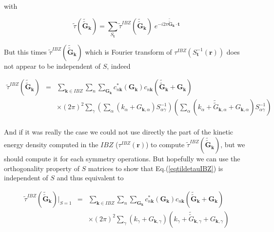 \documentclass[a4paper,12pt]{report}
\begin{document}
with

\begin{equation}
\tilde{\tau}(\tilde{\tilde{\mathbf{G}}}_{\mathbf{k}}) = \sum_{S_{\mathbf{t}}} \tilde{\tau}^{IBZ}(\tilde{\tilde{\mathbf{G}}}_{\mathbf{k}})\; e^{-i2\pi \tilde{\tilde{\mathbf{G}}}_{\mathbf{k}} \cdot \mathbf{t}}
\end{equation}

But this times $\tilde{\tau}^{IBZ}(\tilde{\tilde{\mathbf{G}}}_{\mathbf{k}})$ which is Fourier transform of $\tau^{IBZ}\left(S_{\mathbf{t}}^{-1}(\mathbf{r})\right)$ does not appear to be independent of $S$, indeed

\begin{eqnarray}
\tilde{\tau}^{IBZ}(\tilde{\tilde{\mathbf{G}}}_{\mathbf{k}}) &=& \sum_{\mathbf{k} \in IBZ} \sum_n \sum_{\mathbf{G}_{\mathbf{k}}} c_{n\mathbf{k}}^{*}(\mathbf{G}_{\mathbf{k}}) c_{n\mathbf{k}}(\tilde{\tilde{\mathbf{G}}}_{\mathbf{k}}+\mathbf{G}_{\mathbf{k}})  \nonumber \\
&&\times  (2\pi)^2 \sum_{\gamma} \left(\sum_{\alpha}\left( k_{\alpha} + G_{\mathbf{k},\alpha}\right) S_{\alpha\gamma}^{-1} \right) \left(\sum_{\alpha}\left( k_{\alpha} + \tilde{\tilde{G}}_{\mathbf{k},\alpha} + G_{\mathbf{k},\alpha}\right) S_{\alpha\gamma}^{-1} \right) \nonumber \\
\label{eqtildetauIBZ}
\end{eqnarray}

And if it was really the case we could not use directly the part of the kinetic energy density computed in the $IBZ$ ($\tau^{IBZ}(\mathbf{r})$) to compute $\tilde{\tau}^{IBZ}(\tilde{\tilde{\mathbf{G}}}_{\mathbf{k}})$, but we should compute it for each symmetry operations. But hopefully we can use the orthogonality property of $S$ matrices to show that Eq.(\ref{eqtildetauIBZ}) is independent of $S$ and thus equivalent to

\begin{eqnarray}
\tilde{\tau}^{IBZ}(\tilde{\tilde{\mathbf{G}}}_{\mathbf{k}})\vert_{S=1} &=& \sum_{\mathbf{k} \in IBZ} \sum_n \sum_{\mathbf{G}_{\mathbf{k}}} c_{n\mathbf{k}}^{*}(\mathbf{G}_{\mathbf{k}}) c_{n\mathbf{k}}(\tilde{\tilde{\mathbf{G}}}_{\mathbf{k}}+\mathbf{G}_{\mathbf{k}})  \nonumber \\
&&\times  (2\pi)^2 \sum_{\gamma} \left( k_{\gamma} + G_{\mathbf{k},\gamma} \right) \left( k_{\gamma} + \tilde{\tilde{G}}_{\mathbf{k},\gamma} + G_{\mathbf{k},\gamma} \right) \label{eqtildetauIBZidentity}
\end{eqnarray}
\end{document}
